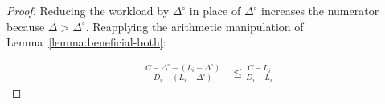 \begin{lemma}
\begin{proof}
    Reducing the workload by ${\Delta^\circ}$ in place of
    ${\Delta^\circ}$ increases the numerator because
    ${\Delta > \Delta^\circ}$. Reapplying the arithmetic manipulation
    of Lemma~\ref{lemma:beneficial-both}:

    \begin{align*}
      \frac{C - \Delta^\circ - (L_i - \Delta^\circ)}
           {D_i - (L_i - \Delta^\circ)}
           &\le
      \frac{C - L_i}
           {D_i - L_i}
    \end{align*}
  \end{proof}
\end{lemma}
